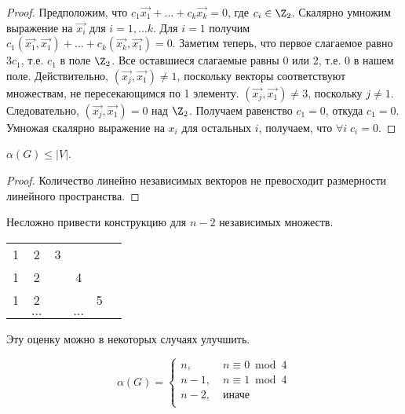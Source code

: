 \begin{proof}
	Предположим, что $ c_1 \overrightarrow{x_1} + \ldots + c_k \overrightarrow{x_k} = 0 $, где $ c_i \in \Z_2 $.
	Скалярно умножим выражение на $ \overrightarrow{x_i} $ для $ i = 1, \ldots k $.
	Для $ i = 1 $ получим $ c_1 (\overrightarrow{x_1}, \overrightarrow{x_1}) + \ldots + c_k (\overrightarrow{x_k}, \overrightarrow{x_1}) = 0$. Заметим теперь, что первое слагаемое равно $ 3 c_1 $, т.е. $ c_1 $ в поле $ \Z_2 $. Все оставшиеся слагаемые равны 0 или 2, т.е. 0 в нашем поле. Действительно, $ (\overrightarrow{x_j}, \overrightarrow{x_1}) \neq 1 $, поскольку векторы соответствуют множествам, не пересекающимся по 1 элементу. $ (\overrightarrow{x_j}, \overrightarrow{x_1}) \neq 3 $, поскольку $ j \neq 1 $. Следовательно, $ (\overrightarrow{x_j}, \overrightarrow{x_1}) = 0 $ над $ \Z_2 $. Получаем равенство $ c_1 = 0$, откуда $ c_1 = 0 $. Умножая скалярно выражение на $ x_i $ для остальных $ i $, получаем, что $ \forall i \; c_i = 0 $.
\end{proof}

\begin{corollary}
	$ \alpha(G) \leqslant |V| $.
\end{corollary} \label{cor:alpha}

\begin{proof}
	Количество линейно независимых векторов не превосходит размерности линейного пространства. 
\end{proof}

Несложно привести конструкцию для $ n - 2 $ независимых множеств.

\begin{center}
	\begin{tabular}[h!]{cccccc} 
		1 & 2 & 3 &&& \\ 
		1 & 2 & & 4 && \\ 
		1 & 2 & & & 5 & \\
		& $\ldots$ & & $ \ldots $ &&  \\
	\end{tabular}
\end{center}

Эту оценку можно в некоторых случаях улучшить.

\begin{theorem}
	$$
	\alpha(G)=\begin{cases}
		n, & \; n \equiv 0\bmod 4\\
		n - 1, & \; n \equiv 1 \bmod{4}\\
		n - 2, & \; \text{иначе} \\
	\end{cases}
	$$
\end{theorem}

